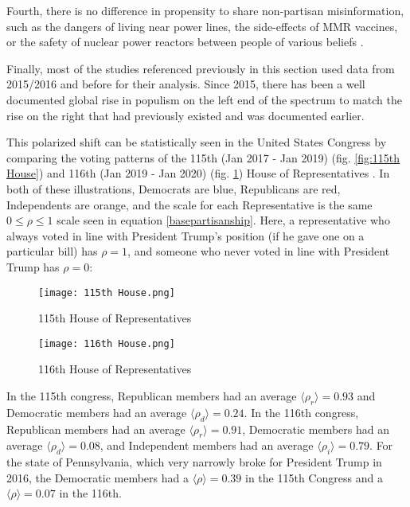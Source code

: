 \documentclass[preprint,review,12pt]{elsarticle}
\begin{document}
Fourth, there is no difference in propensity to share non-partisan misinformation, such as the dangers of living near power lines, the side-effects of MMR vaccines, or the safety of nuclear power reactors between people of various beliefs \cite{kahan2015climate,hara2016co,kahan2012ideology,lewandowsky2016motivated,barbera2015tweeting}.

Finally, most of the studies referenced previously in this section used data from 2015/2016 and before for their analysis. Since 2015, there has been a well documented global rise in populism on the left end of the spectrum to match the rise on the right that had previously existed and was documented earlier. 

This polarized shift can be statistically seen in the United States Congress by comparing the voting patterns of the 115th (Jan 2017 - Jan 2019) (fig. \ref{fig:115th House}) and 116th (Jan 2019 - Jan 2020) (fig. \ref{fig:116th House}) House of Representatives \cite{fivethirtyeight2018tracking}. In both of these illustrations, Democrats are blue, Republicans are red, Independents are orange, and the scale for each Representative is the same $0\leq \rho \leq 1$ scale seen in equation \ref{basepartisanship}. Here, a representative who always voted in line with President Trump's position (if he gave one on a particular bill) has $\rho = 1$, and someone who never voted in line with President Trump has $\rho = 0$:

 \begin{figure}[h]
  \texttt{[image: 115th House.png]}
  \caption{115th House of Representatives}\label{fig:115th House}
\endminipage\hfill
{}
  \texttt{[image: 116th House.png]}
  \caption{116th House of Representatives}\label{fig:116th House}
\endminipage\hfill
\end{figure}
 
 In the 115th congress, Republican members had an average $\langle \rho_r \rangle = 0.93$ and Democratic members had an average $\langle \rho_d \rangle = 0.24$. In the 116th congress, Republican members had an average $\langle \rho_r \rangle = 0.91$, Democratic members had an average $\langle \rho_d \rangle = 0.08$, and Independent members had an average $\langle \rho_i \rangle = 0.79$. For the state of Pennsylvania, which very narrowly broke for President Trump in 2016, the Democratic members had a $\langle \rho \rangle = 0.39$ in the 115th Congress and a $\langle \rho \rangle= 0.07$ in the 116th.
 
\end{document}
